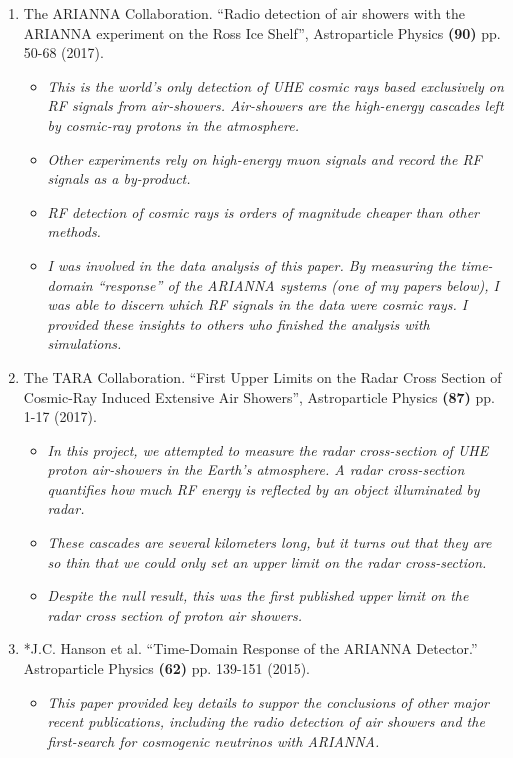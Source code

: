 \documentclass[../../main.tex]{subfiles}
\begin{document}
\begin{enumerate}
\begin{itemize}
\end{itemize}
\item The ARIANNA Collaboration. ``Radio detection of air showers with the ARIANNA experiment on the Ross Ice Shelf'', Astroparticle Physics \textbf{(90)} pp. 50-68 (2017).
\begin{itemize}
\item \textit{This is the world's only detection of UHE cosmic rays based exclusively on RF signals from air-showers.  Air-showers are the high-energy cascades left by cosmic-ray protons in the atmosphere.}
\item \textit{Other experiments rely on high-energy muon signals and record the RF signals as a by-product.}
\item \textit{RF detection of cosmic rays is orders of magnitude cheaper than other methods.}
\item \textit{I was involved in the data analysis of this paper.  By measuring the time-domain ``response'' of the ARIANNA systems (one of my papers below), I was able to discern which RF signals in the data were cosmic rays.  I provided these insights to others who finished the analysis with simulations.}
\end{itemize}
\item The TARA Collaboration. ``First Upper Limits on the Radar Cross Section of Cosmic-Ray Induced Extensive Air Showers'', Astroparticle Physics \textbf{(87)} pp. 1-17 (2017).
\begin{itemize}
\item \textit{In this project, we attempted to measure the radar cross-section of UHE proton air-showers in the Earth's atmosphere. A radar cross-section quantifies how much RF energy is reflected by an object illuminated by radar.}
\item \textit{These cascades are several kilometers long, but it turns out that they are so thin that we could only set an upper limit on the radar cross-section.}
\item \textit{Despite the null result, this was the first published upper limit on the radar cross section of proton air showers.}
\end{itemize}
\item *J.C. Hanson et al. ``Time-Domain Response of the ARIANNA Detector.'' Astroparticle Physics \textbf{(62)} pp. 139-151 (2015).
\begin{itemize}
\item \textit{This paper provided key details to suppor the conclusions of other major recent publications, including the radio detection of air showers and the first-search for cosmogenic neutrinos with ARIANNA.}

\end{itemize}
\end{enumerate}
\end{document}

